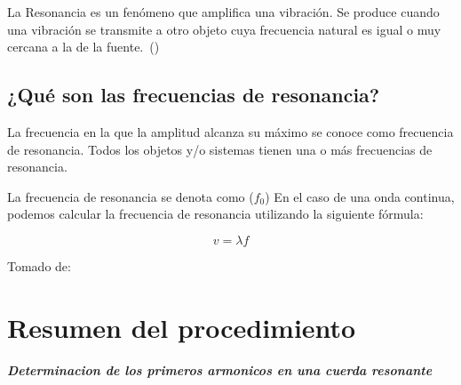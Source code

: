 \documentclass[twocolumn, 12pt]{article}
\newcommand{\bolditalic}[1]{\textbf{\textit{#1}}}
\begin{document}
La Resonancia es un fenómeno que amplifica una vibración.
Se produce cuando una vibración se transmite a otro objeto
cuya frecuencia natural es igual o muy cercana a la de la
fuente.~(\cite{Erbessd_2022})

\subsection{¿Qué son las frecuencias de resonancia?}

La frecuencia en la que la amplitud alcanza su máximo se
conoce como frecuencia de resonancia. Todos los objetos y/o
sistemas tienen una o más frecuencias de resonancia.

La frecuencia de resonancia se denota como ($f_0$) En el
caso de una onda continua, podemos calcular la frecuencia
de resonancia utilizando la siguiente fórmula:

\begin{equation*}
    v = \lambda f
\end{equation*}

Tomado de:~\cite{Resonancia}

\section{Resumen del procedimiento}

\bolditalic{Determinacion de los primeros armonicos en una cuerda resonante}
\end{document}

